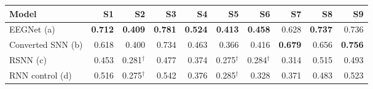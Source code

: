 \documentclass[10pt,letterpaper]{article}
\begin{document}
\vspace{2pt}
\begin{center}\small
\begin{tabular}{@{}lrrrrrrrrr@{}}
\toprule
Model & S1 & S2 & S3 & S4 & S5 & S6 & S7 & S8 & S9 \\
\midrule
EEGNet (a)        & \textbf{0.712} & \textbf{0.409} & \textbf{0.781} & \textbf{0.524} & \textbf{0.413} & \textbf{0.458} & 0.628 & \textbf{0.737} & 0.736 \\
Converted SNN (b) & 0.618 & 0.400 & 0.734 & 0.463 & 0.366 & 0.416 & \textbf{0.679} & 0.656 & \textbf{0.756} \\
RSNN (c)          & 0.453 & 0.281$^\dagger$ & 0.477 & 0.374 & 0.275$^\dagger$ & 0.284$^\dagger$ & 0.314 & 0.515 & 0.493 \\
RNN control (d)   & 0.516 & 0.275$^\dagger$ & 0.542 & 0.376 & 0.285$^\dagger$ & 0.328 & 0.371 & 0.483 & 0.523 \\
\bottomrule
\end{tabular}
\end{center}
\end{document}
